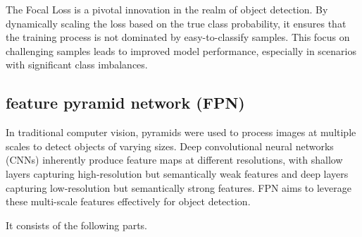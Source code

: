 \documentclass{article}
\begin{document}

The Focal Loss is a pivotal innovation in the realm of object detection. By dynamically scaling the loss based on the true class probability, it ensures that the training process is not dominated by easy-to-classify samples. This focus on challenging samples leads to improved model performance, especially in scenarios with significant class imbalances.

\subsection{feature pyramid network (FPN)}

In traditional computer vision, pyramids were used to process images at multiple scales to detect objects of varying sizes.
Deep convolutional neural networks (CNNs) inherently produce feature maps at different resolutions, with shallow layers capturing high-resolution but semantically weak features and deep layers capturing low-resolution but semantically strong features.
FPN aims to leverage these multi-scale features effectively for object detection.

It consists of the following parts.
\end{document}
